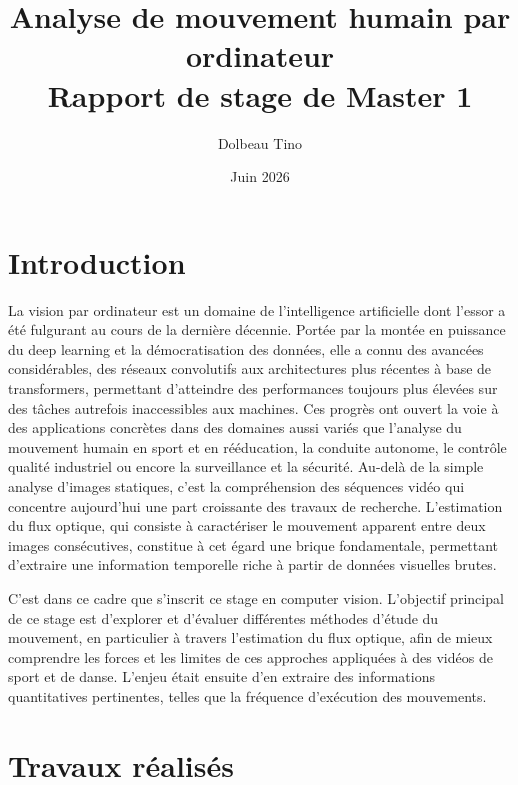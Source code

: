 \documentclass[12pt, letterpaper]{article}
\title{Analyse de mouvement humain par ordinateur\\ Rapport de stage de Master 1}
\author{Dolbeau Tino}
\date{Juin 2026}
\begin{document}
\setlength{\abovecaptionskip}{0pt}
\setlength{\belowcaptionskip}{0pt}

\maketitle

\tableofcontents
\newpage

\section{Introduction}

La vision par ordinateur est un domaine de l'intelligence artificielle dont l'essor a été fulgurant au cours de la dernière décennie. 
Portée par la montée en puissance du deep learning et la démocratisation des données, elle a connu des avancées considérables, des réseaux convolutifs aux architectures plus récentes à base de transformers, 
permettant d'atteindre des performances toujours plus élevées sur des tâches autrefois inaccessibles aux machines. 
Ces progrès ont ouvert la voie à des applications concrètes dans des domaines aussi variés que l'analyse du mouvement humain en sport et en rééducation, 
la conduite autonome, le contrôle qualité industriel ou encore la surveillance et la sécurité. 
Au-delà de la simple analyse d'images statiques, c'est la compréhension des séquences vidéo qui concentre aujourd'hui une part croissante des travaux de recherche. 
L'estimation du flux optique, qui consiste à caractériser le mouvement apparent entre deux images consécutives, constitue à cet égard une brique fondamentale, permettant d'extraire une information temporelle riche à partir de données visuelles brutes. 

C'est dans ce cadre que s'inscrit ce stage en computer vision.
L'objectif principal de ce stage est d'explorer et d'évaluer différentes méthodes d'étude du mouvement, en particulier à travers l'estimation du flux optique, afin de mieux comprendre les forces et les limites de ces approches appliquées à des vidéos de sport et de danse. 
L'enjeu était ensuite d'en extraire des informations quantitatives pertinentes, telles que la fréquence d'exécution des mouvements.




  

\section{Travaux réalisés}
\end{document}
